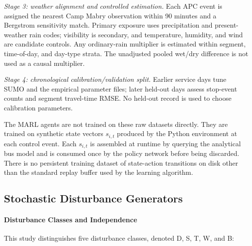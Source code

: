 \textit{Stage 3: weather alignment and controlled estimation.} Each APC event is assigned the nearest Camp Mabry observation within 90 minutes and a Bergstrom sensitivity match. Primary exposure uses precipitation and present-weather rain codes; visibility is secondary, and temperature, humidity, and wind are candidate controls. Any ordinary-rain multiplier is estimated within segment, time-of-day, and day-type strata. The unadjusted pooled wet/dry difference is not used as a causal multiplier.

\textit{Stage 4: chronological calibration/validation split.} Earlier service days tune SUMO and the empirical parameter files; later held-out days assess stop-event counts and segment travel-time RMSE. No held-out record is used to choose calibration parameters.

The MARL agents are not trained on these raw datasets directly. They are trained on synthetic state vectors $s_{i,t}$ produced by the Python environment at each control event. Each $s_{i,t}$ is assembled at runtime by querying the analytical bus model and is consumed once by the policy network before being discarded. There is no persistent training dataset of state-action transitions on disk other than the standard replay buffer used by the learning algorithm.

\subsection{Stochastic Disturbance Generators}
\label{subsec:stochastic-vars}

\paragraph{Disturbance Classes and Independence}

This study distinguishes five disturbance classes, denoted D, S, T, W, and B:

